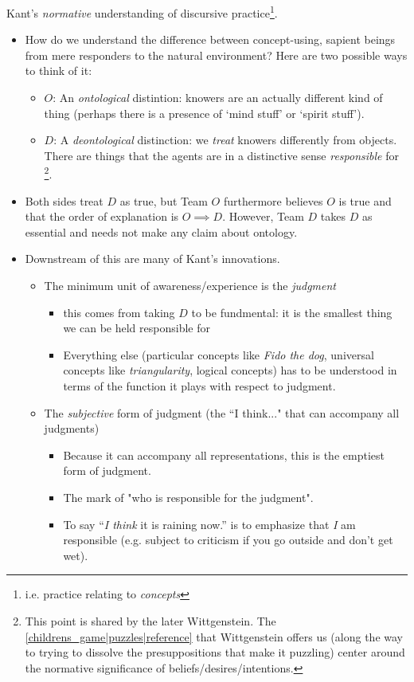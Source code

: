 Kant's \emph{normative} understanding of discursive practice\footnote{i.e. practice relating to \emph{concepts}}.

\begin{itemize}
    \item How do we understand the difference between concept-using, sapient beings from mere responders to the natural environment? Here are two possible ways to think of it: \begin{itemize}
        \item $O$: An \emph{ontological} distintion: knowers are an actually different kind of thing (perhaps there is a presence of `mind stuff' or `spirit stuff').
        \item $D$: A \emph{deontological} distinction: we \emph{treat} knowers differently from objects. There are things that the agents are in a distinctive sense \emph{responsible} for \footnote{This point is shared by the later Wittgenstein. The \ref{childrens_game|puzzles|reference} that Wittgenstein offers us (along the way to trying to dissolve the presuppositions that make it puzzling) center around the normative significance of beliefs/desires/intentions.}.
    \end{itemize}
    \item Both sides treat $D$ as true, but Team $O$ furthermore believes $O$ is true and that the order of explanation is $O \implies D$. However, Team $D$ takes $D$ as essential and needs not make any claim about ontology.

    \item Downstream of this are many of Kant's innovations. \begin{itemize}
    \item The minimum unit of awareness/experience is the \emph{judgment} \begin{itemize}
    \item this comes from taking $D$ to be fundmental: it is the smallest thing we can be held responsible for
    \item Everything else (particular concepts like \emph{Fido the dog}, universal concepts like \emph{triangularity}, logical concepts) has to be understood in terms of the function it plays with respect to judgment.
    \end{itemize}
    \item The \emph{subjective} form of judgment (the ``I think..." that can accompany all judgments)
    \begin{itemize}
    \item Because it can accompany all representations, this is the emptiest form of judgment.
    \item The mark of "who is responsible for the judgment".
    \item To say ``\emph{I think} it is raining now.'' is to emphasize that \emph{I} am responsible (e.g. subject to criticism if you go outside and don't get wet).


\end{itemize}
\end{itemize}
\end{itemize}
